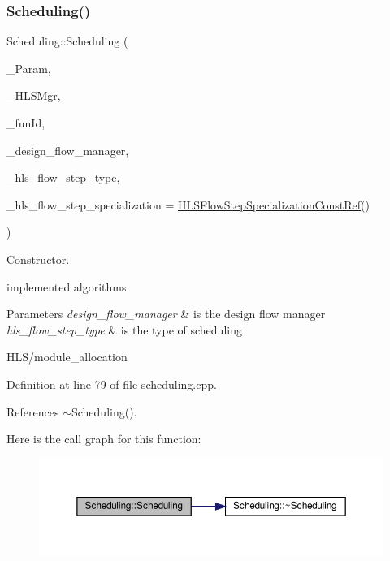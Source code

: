 \subsubsection{\texorpdfstring{Scheduling()}{Scheduling()}}
{\footnotesize\ttfamily Scheduling\+::\+Scheduling (\begin{DoxyParamCaption}\item[{const \hyperlink{Parameter_8hpp_a37841774a6fcb479b597fdf8955eb4ea}{Parameter\+Const\+Ref}}]{\+\_\+\+Param,  }\item[{const \hyperlink{hls__manager_8hpp_acd3842b8589fe52c08fc0b2fcc813bfe}{H\+L\+S\+\_\+manager\+Ref}}]{\+\_\+\+H\+L\+S\+Mgr,  }\item[{unsigned int}]{\+\_\+fun\+Id,  }\item[{const Design\+Flow\+Manager\+Const\+Ref}]{\+\_\+design\+\_\+flow\+\_\+manager,  }\item[{const \hyperlink{hls__step_8hpp_ada16bc22905016180e26fc7e39537f8d}{H\+L\+S\+Flow\+Step\+\_\+\+Type}}]{\+\_\+hls\+\_\+flow\+\_\+step\+\_\+type,  }\item[{const \hyperlink{hls__step_8hpp_a5fdd2edf290c196531d21d68e13f0e74}{H\+L\+S\+Flow\+Step\+Specialization\+Const\+Ref}}]{\+\_\+hls\+\_\+flow\+\_\+step\+\_\+specialization = {\ttfamily \hyperlink{hls__step_8hpp_a5fdd2edf290c196531d21d68e13f0e74}{H\+L\+S\+Flow\+Step\+Specialization\+Const\+Ref}()} }\end{DoxyParamCaption})}



Constructor. 

implemented algorithms


\begin{DoxyParams}{Parameters}
{\em design\+\_\+flow\+\_\+manager} & is the design flow manager \\
\hline
{\em hls\+\_\+flow\+\_\+step\+\_\+type} & is the type of scheduling\\
\hline
\end{DoxyParams}
H\+L\+S/module\+\_\+allocation 

Definition at line 79 of file scheduling.\+cpp.



References $\sim$\+Scheduling().

Here is the call graph for this function\+:
\nopagebreak
\begin{figure}[H]
\begin{center}
\leavevmode
\includegraphics[width=350pt]{db/d2c/classScheduling_ab64d824a1d85312cb1ac54ba91bb335f_cgraph}
\end{center}
\end{figure}
\mbox{\label{classScheduling_a943ed0dbb41df6925eebb44a33d8f74f}} 
